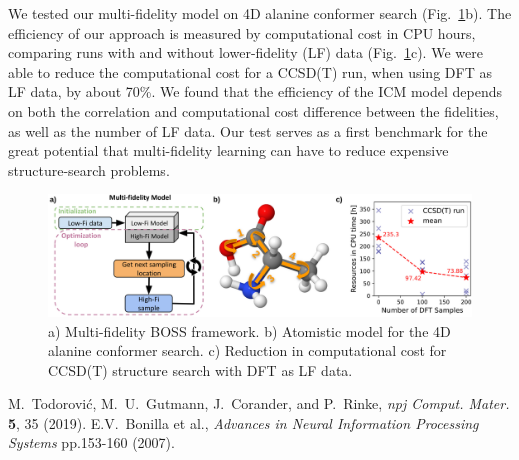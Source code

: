 \documentclass[12pt, a4paper]{article}
\begin{document}
We tested our multi-fidelity model on 4D alanine conformer search 
(Fig.~\ref{fig:tl_with_alanine}b).
The efficiency of our approach is measured by computational 
cost in CPU hours, comparing runs with and without lower-fidelity (LF) data 
(Fig.~\ref{fig:tl_with_alanine}c). We were able to reduce the computational
cost for a CCSD(T) run, when using DFT as LF data, by about 70\%. 
We found that the efficiency of the ICM model depends on both the correlation
and computational cost difference between the fidelities, as well as the
number of LF data. Our test serves as a first benchmark for the great
potential that multi-fidelity learning can have to reduce expensive 
structure-search problems.

\begin{figure}[h]
\centering
\includegraphics[width=\textwidth]{model_alanine_results.png}
\caption{a) Multi-fidelity BOSS framework. b) Atomistic model for the 4D alanine conformer search. 
c) Reduction in computational cost for CCSD(T) structure search with DFT as LF data.}
\label{fig:tl_with_alanine}
\end{figure}


\vspace{2\baselineskip}

\begin{thebibliography}{9}
 M.~Todorović, M.~U.~Gutmann, J.~Corander, and P.~Rinke, {\it npj Comput. Mater.} {\bf 5}, 35 (2019).
 E.V.~Bonilla et al., {\it Advances in Neural Information Processing Systems} {pp.153-160} (2007).

\end{thebibliography}
\end{document}

